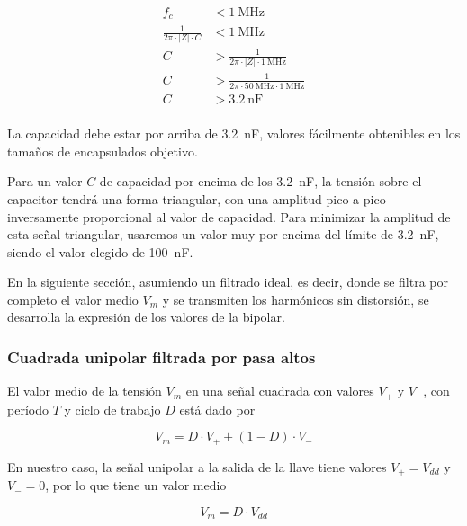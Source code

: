 \begin{equation}
    \begin{aligned}
        f_c &< \qty{1}{\mega\hertz} \\
        \frac{1}{2\pi \cdot |Z| \cdot C} &< \qty{1}{\mega\hertz} \\
        C &> \frac{1}{2\pi \cdot |Z| \cdot \qty{1}{\mega\hertz}} \\
        C &> \frac{1}{2\pi \cdot \qty{50}{\mega\hertz} \cdot \qty{1}{\mega\hertz}} \\
        C &> \qty{3.2}{\nano\farad} \\
    \end{aligned}
\end{equation}

La capacidad debe estar por arriba de \qty{3.2}{\nano\farad}, valores fácilmente
obtenibles en los tamaños de encapsulados objetivo.

Para un valor $C$ de capacidad por encima de los \qty{3.2}{\nano\farad}, la tensión sobre el capacitor tendrá una forma triangular, con una amplitud pico a pico inversamente proporcional al valor de capacidad. Para minimizar la amplitud de esta señal triangular, usaremos un valor muy por encima del límite de \qty{3.2}{\nano\farad}, siendo el valor elegido de \qty{100}{\nano\farad}.

En la siguiente sección, asumiendo un filtrado ideal, es decir, donde se filtra
por completo el valor medio $V_m$ y se transmiten los harmónicos sin distorsión,
se desarrolla la expresión de los valores de la bipolar.

\subsubsection{Cuadrada unipolar filtrada por pasa altos}

El valor medio de la tensión $V_m$ en una señal cuadrada con valores $V_+$ y
$V_-$, con período $T$ y ciclo de trabajo $D$ está dado por

\begin{equation}
    V_m = D \cdot V_+ + (1-D) \cdot V_-
\end{equation}

En nuestro caso, la señal unipolar a la salida de la llave tiene valores
$V_+=V_{dd}$ y $V_-=0$, por lo que tiene un valor medio

\begin{equation}
    V_m = D \cdot V_{dd}
\end{equation}

